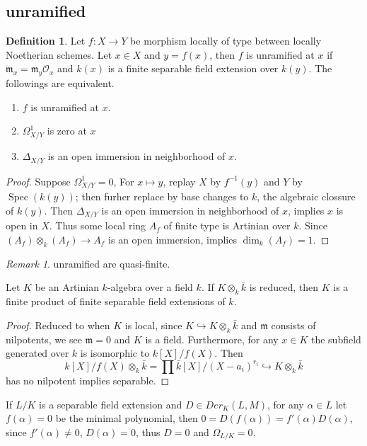 \documentclass[leqno]{amsart}
\DeclareMathOperator{\Spec}{Spec}
\newcommand{\oo}{\mathcal O}
\newcommand{\1}{\mathbf{1}}
\newcommand{\fm}{\mathfrak m}
\theoremstyle{definition}
\newtheorem{defn}[thm]{Definition}
\theoremstyle{remark}
\newtheorem{rem}[thm]{Remark}
\begin{document}
\subsection{unramified}

\begin{defn}
	Let  $f\colon X\to Y$ be morphism locally of type
	between locally Noetherian schemes.
	Let $x\in X$ and $y=f(x)$,
	then  $f$ is unramified at $x$
	if $\fm_x=\fm_y\oo_x$ and $k(x)$ is a 
	finite separable field extension over $k(y)$.
	The followings are equivalent.
	\begin{enumerate}[label=(\alph*)]
		\item $f$ is unramified at  $x$.
		\item  $\Omega^1_{X/Y}$ is zero at $x$
		\item  $\Delta_{X/Y}$ is an open
			immersion in neighborhood of $x$.
	\end{enumerate}
\end{defn}

\begin{proof}
	Suppose $\Omega^1_{X/Y}=0$,
	For $x\mapsto y$,
	replay  $X$ by  $f^{-1}(y)$
	and  $Y$ by  $\Spec(k(y))$;
	then furher replace by base changes
	to  $k$, the algebraic clossure
	of  $k(y)$.
	Then  $\Delta_{X/Y}$ is an open 
	immersion in neighborhood of $x$,
	implies  $x$ is open in  $X$.
	Thus some local ring  $A_f$ 
	of finite type is Artinian over  $k$.
	Since  $(A_f)\otimes_k(A_f)\to A_f$
	is an open immersion, 
	implies  $\dim_k(A_f)=1$.
\end{proof}

\begin{rem}
	unramified are quasi-finite.
\end{rem}


Let $K $ be an Artinian $k$-algebra
over a field $k$.
If $K\otimes_k\bar{k}$ is reduced, 
then   $K$ is a finite product of finite separable
field  extensions of $k$.
\begin{proof}
	Reduced to when $K$ is local,
	since  $K\hookrightarrow K\otimes_k\bar{k}$ 
	and $\fm$ consists of nilpotents,
	we see  $\fm=0$ and  $K$ is a field.
	Furthermore, for any  $x\in K$
	the subfield generated over  $k$
	is isomorphic to  $k[X]/f(X)$.
	Then 
	 \[
		 k[X]/f(X)\otimes_k\bar{k}
		 =\prod\bar{k}[X]/(X-a_i)^{r_i}\hookrightarrow
		 K\otimes_k\bar{k}
	\]
	has no nilpotent implies separable.
\end{proof}
If $L/K$ is a separable field extension
and  $D\in Der_K(L,M)$,
for any  $\alpha\in L$
let  $f(\alpha)=0$ be the minimal polynomial,
then  $0=D(f(\alpha))=f'(\alpha)D(\alpha)$,
since  $f'(\alpha)\neq 0$,  $D(\alpha)=0$,
thus  $D=0$ and  $\Omega_{L/K}=0$.
\end{document}
